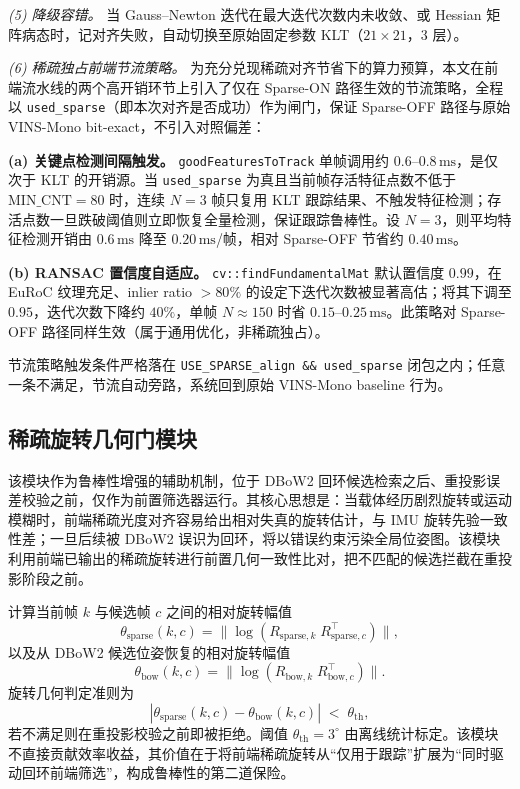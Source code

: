\documentclass[letterpaper,journal]{IEEEtran}
\begin{document}
\textit{(5) 降级容错。} 当 Gauss--Newton 迭代在最大迭代次数内未收敛、或 Hessian 矩阵病态时，记对齐失败，自动切换至原始固定参数 KLT（$21{\times}21$，3 层）。

\textit{(6) 稀疏独占前端节流策略。} 为充分兑现稀疏对齐节省下的算力预算，本文在前端流水线的两个高开销环节上引入了仅在 Sparse-ON 路径生效的节流策略，全程以 \texttt{used\_sparse}（即本次对齐是否成功）作为闸门，保证 Sparse-OFF 路径与原始 VINS-Mono bit-exact，不引入对照偏差：

\noindent\textbf{(a) 关键点检测间隔触发。} \texttt{goodFeaturesToTrack} 单帧调用约 $0.6$--$0.8\,\mathrm{ms}$，是仅次于 KLT 的开销源。当 \texttt{used\_sparse} 为真且当前帧存活特征点数不低于 $\mathrm{MIN\_CNT}=80$ 时，连续 $N{=}3$ 帧只复用 KLT 跟踪结果、不触发特征检测；存活点数一旦跌破阈值则立即恢复全量检测，保证跟踪鲁棒性。设 $N{=}3$，则平均特征检测开销由 $0.6\,\mathrm{ms}$ 降至 $0.20\,\mathrm{ms}$/帧，相对 Sparse-OFF 节省约 $0.40\,\mathrm{ms}$。

\noindent\textbf{(b) RANSAC 置信度自适应。} \texttt{cv::findFundamentalMat} 默认置信度 $0.99$，在 EuRoC 纹理充足、inlier ratio $>80\%$ 的设定下迭代次数被显著高估；将其下调至 $0.95$，迭代次数下降约 $40\%$，单帧 $N\approx150$ 时省 $0.15$--$0.25\,\mathrm{ms}$。此策略对 Sparse-OFF 路径同样生效（属于通用优化，非稀疏独占）。

节流策略触发条件严格落在 \texttt{USE\_SPARSE\_align \&\& used\_sparse} 闭包之内；任意一条不满足，节流自动旁路，系统回到原始 VINS-Mono baseline 行为。

\subsection{稀疏旋转几何门模块}
该模块作为鲁棒性增强的辅助机制，位于 DBoW2 回环候选检索之后、重投影误差校验之前，仅作为前置筛选器运行。其核心思想是：当载体经历剧烈旋转或运动模糊时，前端稀疏光度对齐容易给出相对失真的旋转估计，与 IMU 旋转先验一致性差；一旦后续被 DBoW2 误识为回环，将以错误约束污染全局位姿图。该模块利用前端已输出的稀疏旋转进行前置几何一致性比对，把不匹配的候选拦截在重投影阶段之前。

计算当前帧 $k$ 与候选帧 $c$ 之间的相对旋转幅值
\begin{equation}
\theta_{\mathrm{sparse}}(k, c) = \| \log\!\left( R_{\mathrm{sparse},k}\; R_{\mathrm{sparse},c}^{\top} \right) \|,
\label{eq:sparse_rel_rot}
\end{equation}
以及从 DBoW2 候选位姿恢复的相对旋转幅值
\begin{equation}
\theta_{\mathrm{bow}}(k, c) = \| \log\!\left( R_{\mathrm{bow},k}\; R_{\mathrm{bow},c}^{\top} \right) \|.
\label{eq:bow_rel_rot}
\end{equation}
旋转几何判定准则为
\begin{equation}
|\theta_{\mathrm{sparse}}(k, c) - \theta_{\mathrm{bow}}(k, c)| \;<\; \theta_{\mathrm{th}},
\label{eq:rot_gate}
\end{equation}
若不满足则在重投影校验之前即被拒绝。阈值 $\theta_{\mathrm{th}} = 3^{\circ}$ 由离线统计标定。该模块不直接贡献效率收益，其价值在于将前端稀疏旋转从``仅用于跟踪''扩展为``同时驱动回环前端筛选''，构成鲁棒性的第二道保险。
\end{document}
